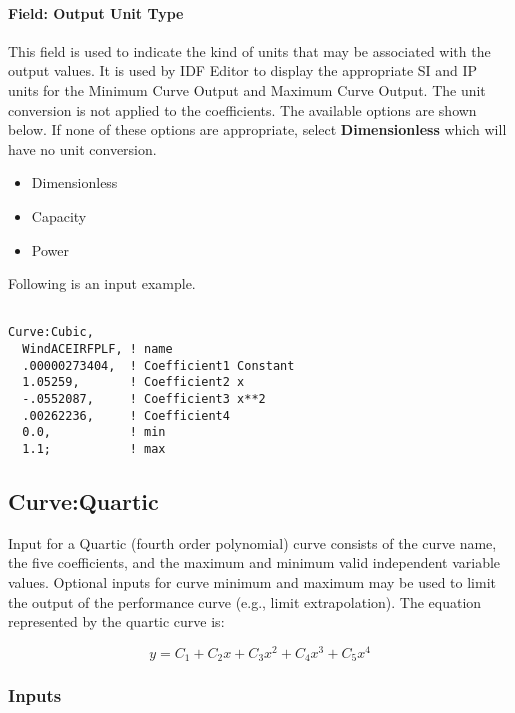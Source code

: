 \paragraph{Field: Output Unit Type}\label{field-output-unit-type-2}

This field is used to indicate the kind of units that may be associated with the output values. It is used by IDF Editor to display the appropriate SI and IP units for the Minimum Curve Output and Maximum Curve Output. The unit conversion is not applied to the coefficients. The available options are shown below. If none of these options are appropriate, select \textbf{Dimensionless} which will have no unit conversion.

\begin{itemize}
\item
  Dimensionless
\item
  Capacity
\item
  Power
\end{itemize}

Following is an input example.

\begin{lstlisting}

Curve:Cubic,
  WindACEIRFPLF, ! name
  .00000273404,  ! Coefficient1 Constant
  1.05259,       ! Coefficient2 x
  -.0552087,     ! Coefficient3 x**2
  .00262236,     ! Coefficient4
  0.0,           ! min
  1.1;           ! max
\end{lstlisting}

\subsection{Curve:Quartic}\label{curvequartic}

Input for a Quartic (fourth order polynomial) curve consists of the curve name, the five coefficients, and the maximum and minimum valid independent variable values. Optional inputs for curve minimum and maximum may be used to limit the output of the performance curve (e.g., limit extrapolation). The equation represented by the quartic curve is:

\begin{equation}
y = {C_1} + {C_2}x + {C_3}{x^2} + {C_4}{x^3} + {C_5}{x^4}
\end{equation}

\subsubsection{Inputs}\label{inputs-4-021}

